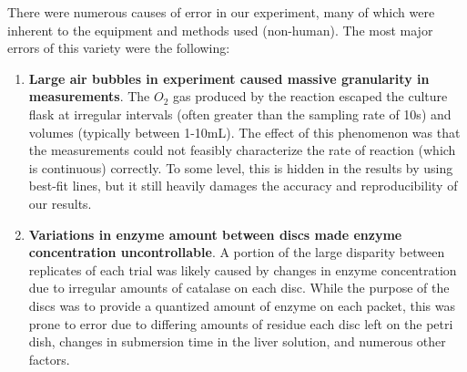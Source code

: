 \documentclass[prl,twocolumn,amsmath,amssymb,superscriptaddress]{revtex4-2}
\begin{document}
There were numerous causes of error in our experiment, many of which were inherent to the equipment and methods used (non-human).
The most major errors of this variety were the following:

\begin{enumerate}
  \item \textbf{Large air bubbles in experiment caused massive granularity in measurements}. The $O_2$ gas produced by the reaction escaped the culture flask at irregular intervals (often greater than the sampling rate of 10s) and volumes (typically between 1-10mL). The effect of this phenomenon was that the measurements could not feasibly characterize the rate of reaction (which is continuous) correctly. To some level, this is hidden in the results by using best-fit lines, but it still heavily damages the accuracy and reproducibility of our results.
  \item \textbf{Variations in enzyme amount between discs made enzyme concentration uncontrollable}. A portion of the large disparity between replicates of each trial was likely caused by changes in enzyme concentration due to irregular amounts of catalase on each disc. While the purpose of the discs was to provide a quantized amount of enzyme on each packet, this was prone to error due to differing amounts of residue each disc left on the petri dish, changes in submersion time in the liver solution, and numerous other factors.
\end{enumerate}
\end{document}
